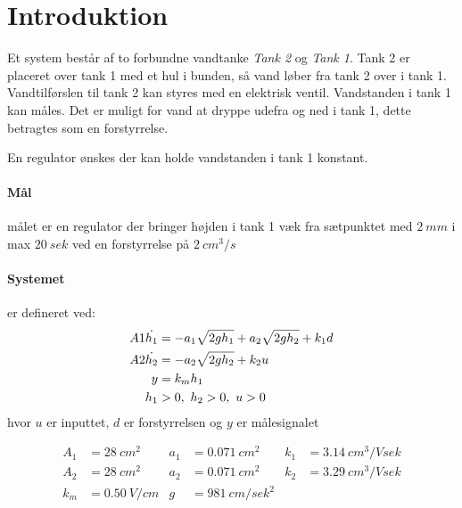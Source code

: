 \section{Introduktion}
Et system består af to forbundne vandtanke \emph{Tank 2} og \emph{Tank 1}. Tank
2 er placeret over tank 1 med et hul i bunden, så vand løber fra tank 2 over i
tank 1. Vandtilførslen til tank 2 kan styres med en elektrisk ventil.
Vandstanden i tank 1 kan måles.
Det er muligt for vand at dryppe udefra og ned i tank 1, dette betragtes som en
forstyrrelse.

En regulator ønskes der kan holde vandstanden i tank 1 konstant.

\paragraph*{Mål}
målet er en regulator der bringer højden i tank 1 væk fra sætpunktet
med $2~mm$ i max $20~sek$ ved en forstyrrelse på $2~cm^3/s$

\paragraph*{Systemet}
er defineret ved:
\begin{align*}
A1 \dot{h_1} &= -a_1\sqrt{2gh_1} + a_2\sqrt{2gh_2} + k_1d\\
A2 \dot{h_2} &= -a_2\sqrt{2gh_2} + k_2u\\
y &= k_mh_1\\
h_1 &> 0,~h_2 > 0,~u>0
\end{align*}
hvor $u$ er inputtet, $d$ er forstyrrelsen og $y$ er målesignalet

\begin{align*}
A_1 &= 28~cm^2 & a_1 &= 0.071~cm^2 & k_1 &= 3.14~cm^3/V sek\\
A_2 &= 28~cm^2 & a_2 &= 0.071~cm^2 & k_2 &= 3.29~cm^3/V sek\\
k_m &= 0.50~V/cm & g &= 981~cm/sek^2
\end{align*}
